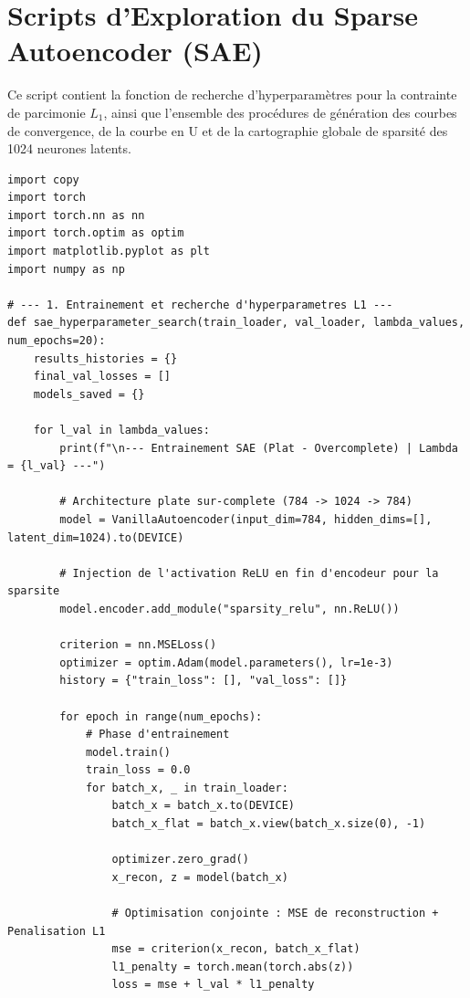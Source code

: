 \documentclass[11pt,a4paper]{report}
\begin{document}
\chapter{Scripts d'Exploration du Sparse Autoencoder (SAE)}

Ce script contient la fonction de recherche d'hyperparamètres pour la contrainte de parcimonie $L_1$, ainsi que l'ensemble des procédures de génération des courbes de convergence, de la courbe en U et de la cartographie globale de sparsité des 1024 neurones latents.

\begin{lstlisting}[caption=Pipeline d'exploration et d'analyse des profils du SAE]
import copy
import torch
import torch.nn as nn
import torch.optim as optim
import matplotlib.pyplot as plt
import numpy as np

# --- 1. Entrainement et recherche d'hyperparametres L1 ---
def sae_hyperparameter_search(train_loader, val_loader, lambda_values, num_epochs=20):
    results_histories = {}
    final_val_losses = []
    models_saved = {}
    
    for l_val in lambda_values:
        print(f"\n--- Entrainement SAE (Plat - Overcomplete) | Lambda = {l_val} ---")
        
        # Architecture plate sur-complete (784 -> 1024 -> 784)
        model = VanillaAutoencoder(input_dim=784, hidden_dims=[], latent_dim=1024).to(DEVICE)
        
        # Injection de l'activation ReLU en fin d'encodeur pour la sparsite
        model.encoder.add_module("sparsity_relu", nn.ReLU())
        
        criterion = nn.MSELoss()
        optimizer = optim.Adam(model.parameters(), lr=1e-3)
        history = {"train_loss": [], "val_loss": []}
        
        for epoch in range(num_epochs):
            # Phase d'entrainement
            model.train()
            train_loss = 0.0
            for batch_x, _ in train_loader:
                batch_x = batch_x.to(DEVICE)
                batch_x_flat = batch_x.view(batch_x.size(0), -1)
                
                optimizer.zero_grad()
                x_recon, z = model(batch_x) 
                
                # Optimisation conjointe : MSE de reconstruction + Penalisation L1
                mse = criterion(x_recon, batch_x_flat)
                l1_penalty = torch.mean(torch.abs(z)) 
                loss = mse + l_val * l1_penalty
                

\end{lstlisting}
\end{document}
